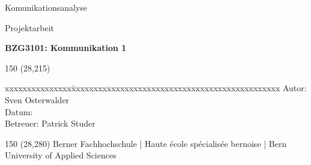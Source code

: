 \begin{titlepage}
\begin{flushleft}

\vspace*{120mm}

\fontsize{26pt}{28pt}\selectfont
Komunikationsanalyse
\vspace{3mm}

\fontsize{20pt}{22pt}\selectfont
Projektarbeit
\vspace{3mm}

\fontsize{10pt}{12pt}\selectfont
\textbf{BZG3101: Kommunikation 1} \\
\vspace{3mm}

\begin{textblock}{150} (28,215)
\fontsize{10pt}{17pt}\selectfont
\begin{tabbing}
xxxxxxxxxxxxxxx\=xxxxxxxxxxxxxxxxxxxxxxxxxxxxxxxxxxxxxxxxxxxxxxx \kill
Autor:        \> Sven Osterwalder\\
Datum:        \> \versiondate\\
Betreuer:     \> Patrick Studer\\
\end{tabbing}

\end{textblock}
\end{flushleft}

\begin{textblock}{150} (28,280)
\noindent 
\color{bfhgrey}\fontsize{9pt}{10pt}\selectfont
Berner Fachhochschule | Haute école spécialisée bernoise | Bern University of Applied Sciences
\color{black}\selectfont
\end{textblock}


\end{titlepage}
